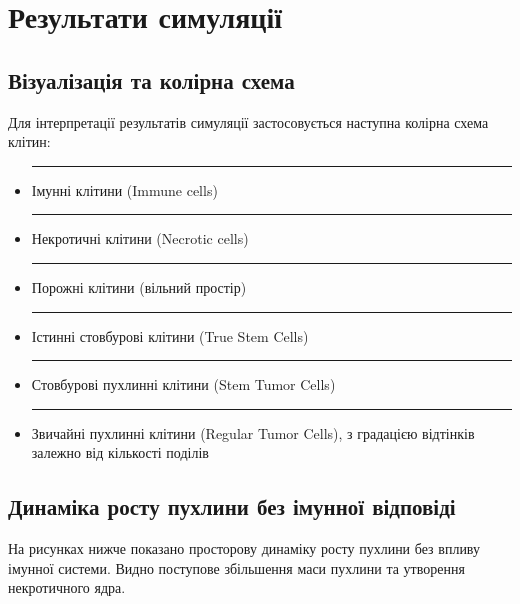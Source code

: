 \documentclass{article}
\begin{document}
\section{Результати симуляції}

\subsection{Візуалізація та колірна схема}

Для інтерпретації результатів симуляції застосовується наступна колірна схема клітин:

\begin{itemize}
    \item \textcolor{blue}{\rule{1em}{1em}} Імунні клітини (Immune cells)
    \item \textcolor{orange}{\rule{1em}{1em}} Некротичні клітини (Necrotic cells)
    \item \textcolor{gray}{\rule{1em}{1em}} Порожні клітини (вільний простір)
    \item \textcolor{yellow}{\rule{1em}{1em}} Істинні стовбурові клітини (True Stem Cells)
    \item \textcolor{green}{\rule{1em}{1em}} Стовбурові пухлинні клітини (Stem Tumor Cells)
    \item \textcolor{red}{\rule{1em}{1em}} Звичайні пухлинні клітини (Regular Tumor Cells), з градацією відтінків залежно від кількості поділів
\end{itemize}

\subsection{Динаміка росту пухлини без імунної відповіді}
На рисунках нижче показано просторову динаміку росту пухлини без впливу імунної системи. Видно поступове збільшення маси пухлини та утворення некротичного ядра.
\end{document}
